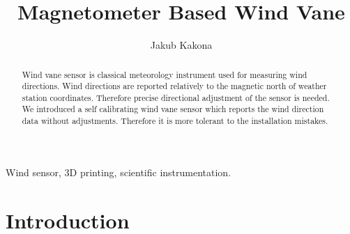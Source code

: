 \documentclass{poster16}
\begin{document}

%
\title{Magnetometer Based Wind Vane}
%

%
\author{Jakub Kakona }
%


\maketitle


\begin{abstract}
Wind vane sensor is classical meteorology instrument used for measuring wind directions. Wind directions are reported relatively to the magnetic north of weather station coordinates. Therefore precise directional adjustment of the sensor is needed. We introduced a self calibrating wind vane sensor which reports the wind direction data without adjustments. Therefore it is more tolerant to the installation mistakes. 
\end{abstract}

\begin{keywords}
Wind sensor, 3D printing, scientific instrumentation.
\end{keywords}


\section{Introduction}
\end{document}
